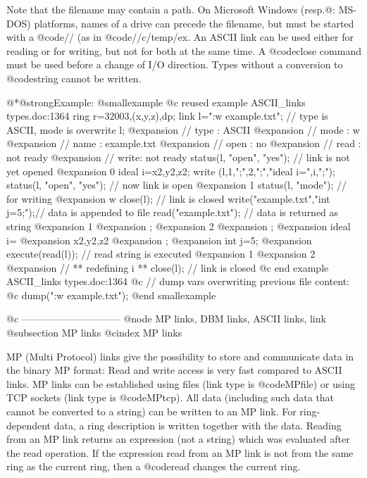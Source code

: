 {{{{{{Note that the filename may contain a path. On Microsoft Windows
(resp.@: MS-DOS) platforms, names of a drive can precede the filename, but
must be started with a @code{//} (as in @code{//c/temp/ex}. An ASCII
link can be used either for reading or for writing, but not for both at
the same time. A @code{close} command must be used before a change of
I/O direction. Types without a conversion to @code{string} cannot be
written.

@*@strong{Example:}
@smallexample
@c reused example ASCII_links types.doc:1364 
  ring r=32003,(x,y,z),dp;
  link l=":w example.txt";     // type is ASCII, mode is overwrite
  l;
@expansion{} // type : ASCII
@expansion{} // mode : w
@expansion{} // name : example.txt
@expansion{} // open : no
@expansion{} // read : not ready
@expansion{} // write: not ready
  status(l, "open", "yes");    // link is not yet opened
@expansion{} 0
  ideal i=x2,y2,z2;
  write (l,1,";",2,";","ideal i=",i,";");
  status(l, "open", "yes");    // now link is open
@expansion{} 1
  status(l, "mode");           // for writing
@expansion{} w
  close(l);                    // link is closed
  write("example.txt","int j=5;");// data is appended to file
  read("example.txt");         // data is returned as string
@expansion{} 1
@expansion{} ;
@expansion{} 2
@expansion{} ;
@expansion{} ideal i=
@expansion{} x2,y2,z2
@expansion{} ;
@expansion{} int j=5;
@expansion{} 
  execute(read(l));            // read string is executed
@expansion{} 1
@expansion{} 2
@expansion{} // ** redefining i **
  close(l);                    // link is closed
@c end example ASCII_links types.doc:1364
@c  // dump vars overwriting previous file content:
@c  dump(":w example.txt");
@end smallexample

@c ------------------------------
@node MP links, DBM links, ASCII links, link
@subsection MP links
@cindex MP links

MP (Multi Protocol) links give the possibility to store and communicate
data in the binary MP format: Read and write access is very fast
compared to ASCII links. MP links can be established using files (link
type is @code{MPfile}) or using TCP sockets (link type is
@code{MPtcp}). All data (including such data that cannot be converted
to a string) can be written to an MP link. For ring-dependent data, a
ring description is written together with the data. Reading from an MP
link returns an expression (not a string) which was evaluated after the
read operation. If the expression read from an MP link is not from the
same ring as the current ring, then a @code{read} changes the current
ring.

}}}}}}
